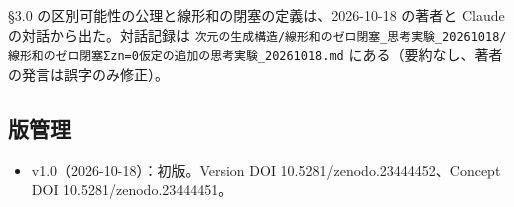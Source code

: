 \documentclass[
  a4paper,
]{ltjsarticle}
\providecommand{\tightlist}{%
  \setlength{\itemsep}{0pt}\setlength{\parskip}{0pt}}
\begin{document}
§3.0 の区別可能性の公理と線形和の閉塞の定義は、2026-10-18 の著者と
Claude の対話から出た。対話記録は
\texttt{次元の生成構造/\allowbreak{}線形和のゼロ閉塞\_\allowbreak{}思考実験\_\allowbreak{}20261018/\allowbreak{}線形和のゼロ閉塞Σzn=0仮定の追加の思考実験\_\allowbreak{}20261018.md}
にある（要約なし、著者の発言は誤字のみ修正）。

\subsection{版管理}\label{ux7248ux7ba1ux7406}

\begin{itemize}
\tightlist
\item
  v1.0（2026-10-18）：初版。Version DOI 10.5281/zenodo.23444452、Concept
  DOI 10.5281/zenodo.23444451。
\end{itemize}
\end{document}
